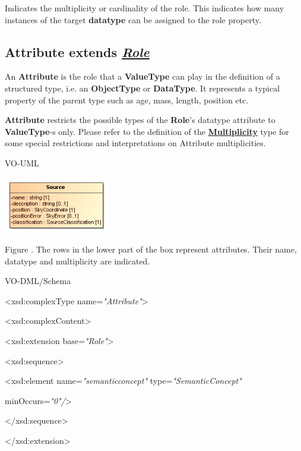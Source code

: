 \documentclass[10pt,a4paper]{ivoa}
\begin{document}
Indicates the multiplicity or cardinality of the role. This indicates
how many instances of the target \textbf{datatype} can be assigned to
the role property.

\hypertarget{attribute-extends-role}{%
\subsection{\texorpdfstring{Attribute extends
\protect\hyperlink{role-extends-referableelement}{\emph{Role}}}{Attribute extends Role}}\label{attribute-extends-role}}

An \textbf{Attribute} is the role that a \textbf{ValueType} can play in
the definition of a structured type, i.e. an \textbf{ObjectType} or
\textbf{DataType}. It represents a typical property of the parent type
such as age, mass, length, position etc.

\textbf{Attribute} restricts the possible types of the \textbf{Role}'s
datatype attribute to \textbf{ValueType}-s only. Please refer to the
definition of the
\protect\hyperlink{multiplicity}{\textbf{Multiplicity}} type for some
special restrictions and interpretations on Attribute multiplicities.

VO-UML

\includegraphics[width=1.8in,height=0.96667in]{./media/image16.png}

Figure . The rows in the lower part of the box represent attributes.
Their name, datatype and multiplicity are indicated.

VO-DML/Schema

\textless xsd:complexType name=\emph{"Attribute"}\textgreater{}

\textless xsd:complexContent\textgreater{}

\textless xsd:extension base=\emph{"Role"}\textgreater{}

\textless xsd:sequence\textgreater{}

\textless xsd:element name=\emph{"semanticconcept"}
type=\emph{"SemanticConcept"}

minOccurs=\emph{"0"/}\textgreater{}

\textless/xsd:sequence\textgreater{}

\textless/xsd:extension\textgreater{}
\end{document}

